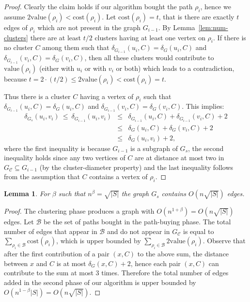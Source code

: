 \documentclass[a4paper,11pt]{article}
\newtheorem{lemma}{Lemma}[section]
\theoremstyle{definition}
\newcommand{\dist}{\delta}
\newcommand{\cost}{\mathrm{cost}}
\newcommand{\val}{\mathrm{value}}
\newcommand{\cC}{\mathcal{C}}
\newcommand{\cB}{\mathcal{B}}
\begin{document}
\begin{proof}
Clearly the claim holds if our algorithm bought the path $\rho_i$,
hence we assume $2\val(\rho_i) < \cost(\rho_i)$.
Let $\cost(\rho_i)=t$, that is there are exactly $t$
edges of $\rho_i$ which are not present in the graph $G_{i-1}$.
By Lemma~\ref{lem:num-clusters} there are at least $t/2$ clusters having
at least one vertex on $\rho_i$.
If there is no cluster $C$ among them such that 
$\dist_{G_{i-1}}(u_i,C) = \dist_{G}(u_i,C)$ and
$\dist_{G_{i-1}}(v_i,C) = \dist_{G}(v_i,C)$,
then all these clusters would contribute to $\val(\rho_i)$ (either with $u_i$ or with $v_i$ or both)
which leads to a contradiction, because $t = 2 \cdot (t/2) \le 2\val(\rho_i) < \cost(\rho_i) = t$.


Thus there is a cluster $C$ having a vertex of $\rho_i$ such that 
$\delta_{G_{i-1}}(u_i,C)=\delta_{G}(u_i,C)$ and
$\delta_{G_{i-1}}(v_i,C)=\delta_{G}(v_i,C)$. This implies:
\begin{eqnarray*}
\delta_{G_s}(u_i,v_i) \ \le \ \delta_{G_{i-1}}(u_i,v_i) & \le & \delta_{G_{i-1}}(u_i,C) + \delta_{G_{i-1}}(v_i,C)+2 \\
& \le & \delta_{G}(u_i,C)+\delta_{G}(v_i,C)+2\\
&\le  & \delta_G(u_i,v_i)+2,
\end{eqnarray*}
where the first inequality is because $G_{i-1}$ is a subgraph 
of $G_s$,
the second inequality holds since any two vertices of $C$ are at distance at most two in $G_\cC \subseteq G_{i-1}$ (by the cluster-diameter property)
and the last inequality follows from the assumption that $C$ contains a vertex of $\rho_i$.
\end{proof}

\begin{lemma}
\label{lem:s-2}
For $\beta$ such that $n^{\beta}=\sqrt{|S|}$ 
the graph $G_s$ contains $O(n\sqrt{|S|})$ edges.
\end{lemma}

\begin{proof}
The clustering phase produces a graph with $O(n^{1+\beta})=O(n\sqrt{|S|})$ edges.
Let $\cB$ be the set of paths bought in the path-buying phase.
The total number of edges that appear in $\cB$ and do not appear in $G_\cC$
is equal to $\sum_{\rho_i \in \cB} \cost(\rho_i)$, which is 
upper bounded by $\sum_{\rho_i \in \cB} 2\val(\rho_i)$.
Observe that after the first contribution of a pair $(x,C)$
to the above sum, the distance between $x$ and $C$ is at most $\dist_G(x,C)+2$,
hence each pair $(x,C)$ can contribute to the sum at most $3$ times.
Therefore the total number of edges added in the second phase of our algorithm
is upper bounded by $O(n^{1-\beta}|S|)=O(n\sqrt{|S|})$.
\end{proof}
\end{document}
